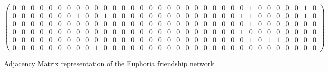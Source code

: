 \documentclass[runningheads]{llncs}
\begin{document}
\begin{figure}
\[\begin{pmatrix}
0 & 0 & 0 & 0 & 0 & 0 & 0 & 0 & 0 & 0 & 0 & 0 & 0 & 0 & 0 & 0 & 0 & 0 & 0 & 0 & 0 & 0 & 0 & 0 & 0 & 0 & 1 & 0 & 0 & 0 & 0 & 0 & 1 & 0 \\
0 & 0 & 0 & 0 & 0 & 0 & 0 & 1 & 0 & 0 & 1 & 0 & 0 & 0 & 0 & 0 & 0 & 0 & 0 & 0 & 0 & 0 & 0 & 0 & 0 & 1 & 1 & 0 & 0 & 0 & 0 & 0 & 1 & 0 \\
0 & 0 & 0 & 0 & 0 & 0 & 0 & 0 & 0 & 0 & 0 & 0 & 0 & 0 & 0 & 0 & 0 & 0 & 0 & 0 & 0 & 0 & 0 & 0 & 0 & 0 & 1 & 0 & 0 & 0 & 0 & 0 & 0 & 0 \\
0 & 0 & 0 & 0 & 0 & 0 & 0 & 0 & 0 & 0 & 0 & 0 & 0 & 0 & 0 & 0 & 0 & 0 & 0 & 0 & 0 & 0 & 0 & 0 & 0 & 1 & 0 & 0 & 0 & 0 & 0 & 0 & 0 & 0 \\
0 & 0 & 0 & 0 & 0 & 0 & 0 & 0 & 0 & 0 & 0 & 0 & 0 & 0 & 0 & 0 & 0 & 0 & 0 & 0 & 0 & 0 & 0 & 0 & 0 & 0 & 1 & 0 & 1 & 1 & 0 & 0 & 0 & 0 \\
0 & 0 & 0 & 0 & 0 & 0 & 0 & 0 & 0 & 1 & 0 & 0 & 0 & 0 & 0 & 0 & 0 & 0 & 0 & 0 & 0 & 0 & 0 & 0 & 0 & 0 & 0 & 0 & 0 & 0 & 0 & 0 & 0 & 0
\end{pmatrix}\]
\caption{Adjacency Matrix representation of the Euphoria friendship network} \label{fig5}
\end{figure}
\FloatBarrier
\section{}
\end{document}
